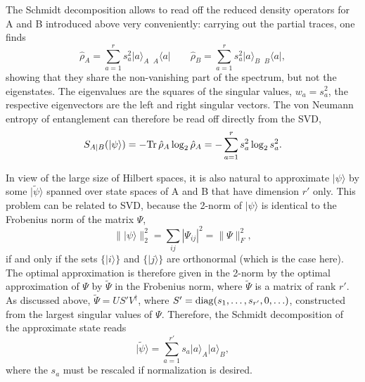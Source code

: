 \documentclass[a4paper,10pt,oneside,onecolumn,1p,times]{elsarticle}
\newcommand{\tr}{{\rm Tr }}
\newcommand{\bra}[1]{\mbox{$\langle #1  |$}}
\newcommand{\ket}[1]{\mbox{$| #1  \rangle$}}
\begin{document}
The Schmidt decomposition allows to read off the reduced density operators for A and B introduced above very conveniently: carrying out the partial traces, one finds
\begin{equation}
\hat{\rho}_A = \sum_{a=1}^r s^2_a \ket{a}_A  \phantom\rangle_A \bra{a} \quad\quad \hat{\rho}_B = \sum_{a=1}^r s^2_a \ket{a}_B \phantom\rangle_B \bra{a} ,
\end{equation}
showing that they share the non-vanishing part of the spectrum, but not the eigenstates. The eigenvalues are the squares of the singular values, $w_a = s^2_a$, the respective eigenvectors are the left and right singular vectors.  The von Neumann entropy of entanglement can therefore be read off directly from the SVD,
\begin{equation}
S_{A|B}(\ket{\psi}) = - \tr\, \hat{\rho}_A \log_2 \hat{\rho}_A = - \sum_{a=1}^r s_a^2 \log_2 s_a^2 .
\end{equation}

In view of the large size of Hilbert spaces, it is also natural to approximate $\ket{\psi}$ by some $\ket{\tilde{\psi}}$ spanned over state spaces of A and B that have dimension $r'$ only. This problem can be related to SVD, because the 2-norm of $\ket{\psi}$ is identical to the Frobenius norm of the matrix $\Psi$,
\begin{equation}
\| \ket{\psi} \|_2^2 = \sum_{ij} | \Psi_{ij} |^2 = \| \Psi \|_F^2 ,
\end{equation}
if and only if the sets $\{ \ket{i} \}$ and $\{ \ket{j} \}$ are orthonormal (which is the case here).
The optimal approximation is therefore given in the 2-norm by the optimal approximation of $\Psi$ by $\tilde{\Psi}$ in the Frobenius norm, where $\tilde{\Psi}$ is a matrix of rank $r'$. As discussed above, $\tilde{\Psi} = US' V^\dagger$, where $S'={\rm diag}(s_1, \ldots, s_{r'}, 0, \ldots)$, constructed from the largest singular values of $\Psi$. Therefore, the Schmidt decomposition of the approximate state reads
\begin{equation}
\ket{\tilde{\psi}} = \sum_{a=1}^{r'} s_a \ket{a}_A \ket{a}_B ,
\label{eq:Schmidtapproximation}
\end{equation}
where the $s_a$ must be rescaled if normalization is desired.
\end{document}
